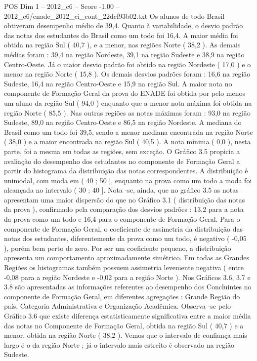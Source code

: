 \begin{textsample}{POS Dim 1 – 2012\_c6 – Score -1.00 – 2012\_c6/enade\_2012\_ci\_cont\_22dcf93b02.txt}
Os alunos de todo Brasil obtiveram desempenho médio de 39,4.
Quanto à variabilidade, o desvio padrão das notas dos estudantes do Brasil como um todo foi 16,4.
A maior média foi obtida na região Sul ( 40,7 ), e a menor, nas regiões Norte ( 38,2 ).
As demais médias foram : 39,4 na região Nordeste, 39,1 na região Sudeste e 38,9 na região Centro-Oeste.
Já o maior desvio padrão foi obtido na região Nordeste ( 17,0 ) e o menor na região Norte ( 15,8 ).
Os demais desvios padrões foram : 16,6 na região Sudeste, 16,4 na região Centro-Oeste e 15,9 na região Sul.
A maior nota no componente de Formação Geral da prova do ENADE foi obtida por pelo menos um aluno da região Sul ( 94,0 ) enquanto que a menor nota máxima foi obtida na região Norte ( 85,5 ).
Nas outras regiões as notas máximas foram : 93,0 na região Sudeste, 89,0 na região Centro-Oeste e 86,5 na região Nordeste.
A mediana do Brasil como um todo foi 39,5, sendo a menor mediana encontrada na região Norte ( 38,0 ) e a maior encontrada na região Sul ( 40,5 ).
A nota mínima ( 0,0 ), nesta parte, foi a mesma em todas as regiões, sem exceção.
O Gráfico 3.5 propicia a avaliação do desempenho dos estudantes no componente de Formação Geral a partir do histograma da distribuição das notas correspondentes.
A distribuição é unimodal, com moda em ( 40 ; 50 ], enquanto na prova como um todo a moda foi alcançada no intervalo ( 30 ; 40 ].
Nota -se, ainda, que no gráfico 3.5 as notas apresentam uma maior dispersão do que no Gráfico 3.1 ( distribuição das notas da prova ), confirmado pela comparação dos desvios padrões : 13,2 para a nota da prova como um todo e 16,4 para o componente de Formação Geral.
Para o componente de Formação Geral, o coeficiente de assimetria da distribuição das notas dos estudantes, diferentemente da prova como um todo, é negativo ( -0,05 ), porém bem perto de zero.
Por ser um coeficiente pequeno, a distribuição apresenta um comportamento aproximadamente simétrico.
Em todas as Grandes Regiões os histogramas também possuem assimetria levemente negativa ( entre -0,08 para a região Nordeste e -0,02 para a região Norte ).
Nos Gráficos 3.6, 3.7 e 3.8 são apresentadas as informações referentes ao desempenho dos Concluintes no componente de Formação Geral, em diferentes agregações : Grande Região do país, Categoria Administrativa e Organização Acadêmica.
Observa -se pelo Gráfico 3.6 que existe diferença estatisticamente significativa entre a maior média das notas no Componente de Formação Geral, obtida na região Sul ( 40,7 ) e a menor, obtida na região Norte ( 38,2 ).
Vemos que o intervalo de confiança mais largo é o da região Norte ; já o intervalo mais estreito é observado na região Sudeste.

\end{textsample}
